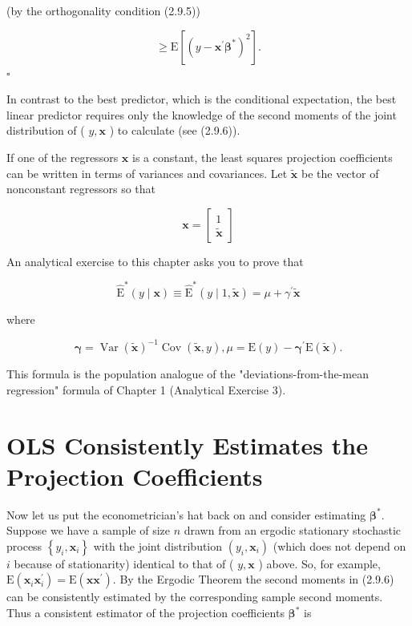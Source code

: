 \documentclass[10pt]{article}
\begin{document}
(by the orthogonality condition (2.9.5))

$$
\geq \mathrm{E}\left[\left(y-\mathbf{x}^{\prime} \boldsymbol{\beta}^{*}\right)^{2}\right] .
$$ \(\square\)

In contrast to the best predictor, which is the conditional expectation, the best linear predictor requires only the knowledge of the second moments of the joint distribution of ( $y, \mathbf{x}$ ) to calculate (see (2.9.6)).

If one of the regressors $\mathbf{x}$ is a constant, the least squares projection coefficients can be written in terms of variances and covariances. Let $\tilde{\mathbf{x}}$ be the vector of nonconstant regressors so that

$$
\mathbf{x}=\left[\begin{array}{c}
1 \\
\tilde{\mathbf{x}}
\end{array}\right]
$$

An analytical exercise to this chapter asks you to prove that


\begin{equation*}
\widehat{\mathrm{E}}^{*}(y \mid \mathbf{x}) \equiv \widehat{\mathrm{E}}^{*}(y \mid 1, \tilde{\mathbf{x}})=\mu+\gamma^{\prime} \tilde{\mathbf{x}} \tag{2.9.7}
\end{equation*}


where

$$
\boldsymbol{\gamma}=\operatorname{Var}(\tilde{\mathbf{x}})^{-1} \operatorname{Cov}(\tilde{\mathbf{x}}, y), \mu=\mathrm{E}(y)-\boldsymbol{\gamma}^{\prime} \mathrm{E}(\tilde{\mathbf{x}}) .
$$

This formula is the population analogue of the "deviations-from-the-mean regression" formula of Chapter 1 (Analytical Exercise 3).

\section*{OLS Consistently Estimates the Projection Coefficients}
Now let us put the econometrician's hat back on and consider estimating $\boldsymbol{\beta}^{*}$. Suppose we have a sample of size $n$ drawn from an ergodic stationary stochastic process $\left\{y_{i}, \mathbf{x}_{i}\right\}$ with the joint distribution $\left(y_{i}, \mathbf{x}_{i}\right)$ (which does not depend on $i$ because of stationarity) identical to that of ( $y, \mathbf{x}$ ) above. So, for example, $\mathrm{E}\left(\mathbf{x}_{i} \mathbf{x}_{i}^{\prime}\right)=\mathrm{E}\left(\mathbf{x x}^{\prime}\right)$. By the Ergodic Theorem the second moments in (2.9.6) can be consistently estimated by the corresponding sample second moments. Thus a consistent estimator of the projection coefficients $\boldsymbol{\beta}^{*}$ is
\end{document}
